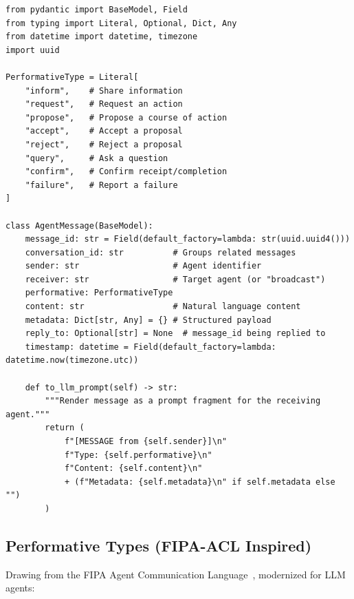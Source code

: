 \begin{lstlisting}[style=pythonstyle, caption={Agent message schema}]
from pydantic import BaseModel, Field
from typing import Literal, Optional, Dict, Any
from datetime import datetime, timezone
import uuid

PerformativeType = Literal[
    "inform",    # Share information
    "request",   # Request an action
    "propose",   # Propose a course of action
    "accept",    # Accept a proposal
    "reject",    # Reject a proposal
    "query",     # Ask a question
    "confirm",   # Confirm receipt/completion
    "failure",   # Report a failure
]

class AgentMessage(BaseModel):
    message_id: str = Field(default_factory=lambda: str(uuid.uuid4()))
    conversation_id: str          # Groups related messages
    sender: str                   # Agent identifier
    receiver: str                 # Target agent (or "broadcast")
    performative: PerformativeType
    content: str                  # Natural language content
    metadata: Dict[str, Any] = {} # Structured payload
    reply_to: Optional[str] = None  # message_id being replied to
    timestamp: datetime = Field(default_factory=lambda: datetime.now(timezone.utc))

    def to_llm_prompt(self) -> str:
        """Render message as a prompt fragment for the receiving agent."""
        return (
            f"[MESSAGE from {self.sender}]\n"
            f"Type: {self.performative}\n"
            f"Content: {self.content}\n"
            + (f"Metadata: {self.metadata}\n" if self.metadata else "")
        )
\end{lstlisting}

\subsection{Performative Types (FIPA-ACL Inspired)}
\label{performative-types-fipa-acl-inspired}

Drawing from the FIPA Agent Communication Language~\cite{fipa2002acl}, modernized for LLM agents:

